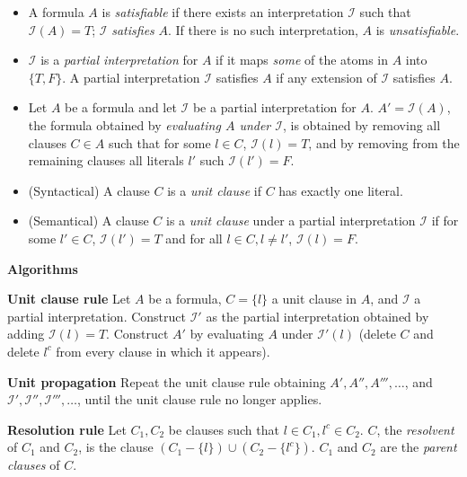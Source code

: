 \documentclass[11pt]{report}
\begin{document}
\begin{itemize}
\item A formula $A$ is \emph{satisfiable} if there exists an
interpretation $\mathcal{I}$ such that $\mathcal{I}(A)=T$; $\mathcal{I}$
\emph{satisfies} $A$. If there is no such interpretation, $A$ is
\emph{unsatisfiable}.

\item $\mathcal{I}$ is a \emph{partial interpretation} for $A$ if it
maps \emph{some} of the atoms in $A$ into $\{T,F\}$. A partial
interpretation $\mathcal{I}$ satisfies $A$ if any extension of
$\mathcal{I}$ satisfies $A$.

\item Let $A$ be a formula and let $\mathcal{I}$ be a partial
interpretation for $A$. $A'=\mathcal{I}(A)$, the formula obtained by
\emph{evaluating $A$ under $\mathcal{I}$}, is obtained by removing all
clauses $C\in A$ such that for some $l\in C$, $\mathcal{I}(l)=T$, and by
removing from the remaining clauses all literals $l'$ such
$\mathcal{I}(l')=F$.

\item (Syntactical) A clause $C$ is a \emph{unit clause} if $C$
has exactly one literal.

\item (Semantical) A clause $C$ is a \emph{unit clause} under a partial
interpretation $\mathcal{I}$ if for some $l'\in C$, $\mathcal{I}(l')=T$
and for all $l\in C, l\neq l'$, $\mathcal{I}(l)=F$.

\end{itemize}

\bigskip

\begin{center}
\textbf{Algorithms}
\end{center}

\textbf{Unit clause rule} Let $A$ be a formula, $C=\{l\}$ a unit clause
in $A$, and $\mathcal{I}$ a partial interpretation. Construct
$\mathcal{I}'$ as the partial interpretation obtained by adding
$\mathcal{I}(l)=T$. Construct $A'$ by evaluating $A$ under
$\mathcal{I}'(l)$ (delete $C$ and delete $l^{c}$ from every clause in
which it appears).

\textbf{Unit propagation} Repeat the unit clause rule obtaining $A',
A'', A''', \ldots$, and
$\mathcal{I}',\mathcal{I}'',\mathcal{I}''',\ldots$, until the unit
clause rule no longer applies.

\textbf{Resolution rule} Let $C_{1},C_{2}$ be clauses such that $l\in
C_{1},l^{c}\in C_{2}$. $C$, the \emph{resolvent} of $C_{1}$ and $C_{2}$,
is the clause $(C_{1}-\{l\}) \cup (C_{2}-\{l^{c}\})$. $C_{1}$ and
$C_{2}$ are the \emph{parent clauses} of $C$.
\end{document}
